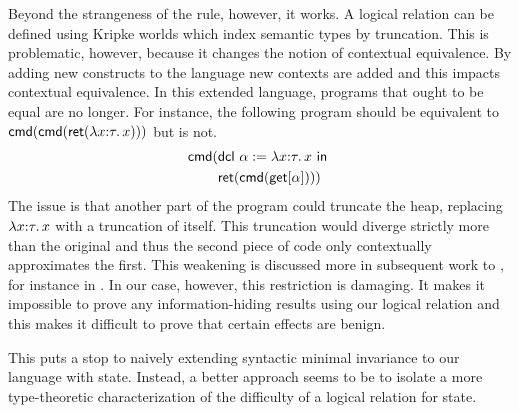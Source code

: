 Beyond the strangeness of the rule, however, it works. A logical
relation can be defined using Kripke worlds which index semantic types
by truncation. This is problematic, however, because it changes the
notion of contextual equivalence. By adding new constructs to the
language new contexts are added and this impacts contextual
equivalence. In this extended language, programs that ought to be
equal are no longer. For instance, the following program should be
equivalent to $\mathsf{cmd}(\mathsf{cmd}(\mathsf{ret}(\lambda x {:} \tau.\, x)))$ but is not.
\begin{align*}
  \mathsf{cmd}(& \mathsf{dcl}\ \alpha := \lambda x {:} \tau.\, x\ \mathsf{in}\ \\
       & \mathsf{ret}(\mathsf{cmd}(\mathsf{get}[\alpha])))
\end{align*}
The issue is that another part of the program could truncate the heap,
replacing $\lambda x {:} \tau.\, x$ with a truncation of itself. This
truncation would diverge strictly more than the original and thus the
second piece of code only contextually approximates the first. This
weakening is discussed more in subsequent work to
\citet{Birkedal:domain:10}, for instance in
\citet{Birkedal:adts:12}. In our case, however, this restriction is
damaging. It makes it impossible to prove any information-hiding
results using our logical relation and this makes it difficult to
prove that certain effects are benign.

This puts a stop to naively extending syntactic minimal invariance to
our language with state. Instead, a better approach seems to be to
isolate a more type-theoretic characterization of the difficulty of a
logical relation for state.

